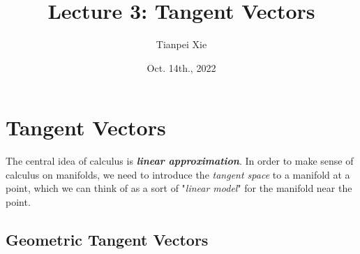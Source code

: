 \documentclass[11pt]{article}
\begin{document}
\title{Lecture 3: Tangent Vectors}
\author{ Tianpei Xie}
\date{Oct. 14th., 2022}
\maketitle
\tableofcontents
\newpage
\section{Tangent Vectors}
The central idea of calculus is \emph{\textbf{linear approximation}}. In order to make sense of calculus on manifolds, we need to introduce the \emph{tangent space} to a manifold at a point, which we can think of as a sort of "\emph{linear model}" for the manifold near the point. 
\subsection{Geometric Tangent Vectors}
\end{document}

